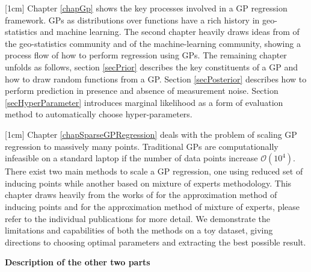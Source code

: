 [1cm]
Chapter \ref{chapGp} shows the key processes involved in a GP regression framework. GPs as distributions over functions have a rich history in geo-statistics and machine learning. The second chapter heavily draws ideas from \cite{krige2015statistical, matheron1963principles} of the geo-statistics community and \cite{Stein1999Springer, kennedy2000predicting, Rasmussen2005, mackay2003information} of the machine-learning community, showing a process flow of how to perform regression using GPs. The remaining chapter unfolds as follows, section \ref{secPrior} describes the key constituents of a GP and how to draw random functions from a GP. Section \ref{secPosterior} describes how to perform prediction in presence and absence of measurement noise. Section \ref{secHyperParameter} introduces marginal likelihood as a form of evaluation method to automatically choose hyper-parameters. 

[1cm]
Chapter \ref{chapSparseGPRegression} deals with the problem of scaling GP regression to massively many points. Traditional GPs are computationally infeasible on a standard laptop if the number of data points increase \(\mathcal{O}(10^4)\). There exist two main methods to scale a GP regression, one using reduced set of inducing points while another based on mixture of experts methodology. This chapter draws heavily from the works of \cite{quinonero2005unifying, seeger2003fast, Snelson06sparsegaussian, Titsias09variationallearning} for the approximation method of inducing points and \cite{cao2014generalized, tresp2000bayesian, chen2009bagging, deisenroth2015distributed} for the approximation method of mixture of experts, please refer to the individual publications for more detail. We demonstrate the limitations and capabilities of both the methods on a toy dataset, giving directions to choosing optimal parameters and extracting the best possible result.  

\textbf{Description of the other two parts}

